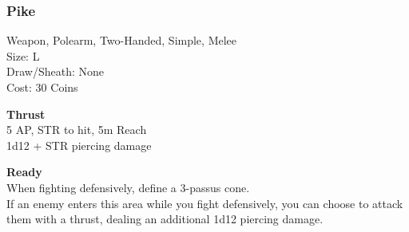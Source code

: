 \subsubsection{Pike}\label{weapon:pike}
Weapon, Polearm, Two-Handed, Simple, Melee\\
Size: L\\
Draw/Sheath: None\\
Cost: 30 Coins

\textbf{Thrust}\\
5 AP, STR to hit, 5m Reach\\
1d12 + \texttimes STR piercing damage

\textbf{Ready}\\
When fighting defensively, define a 3-passus cone.\\
If an enemy enters this area while you fight defensively, you can choose to attack them with a thrust, dealing an additional 1d12 piercing damage.\\

